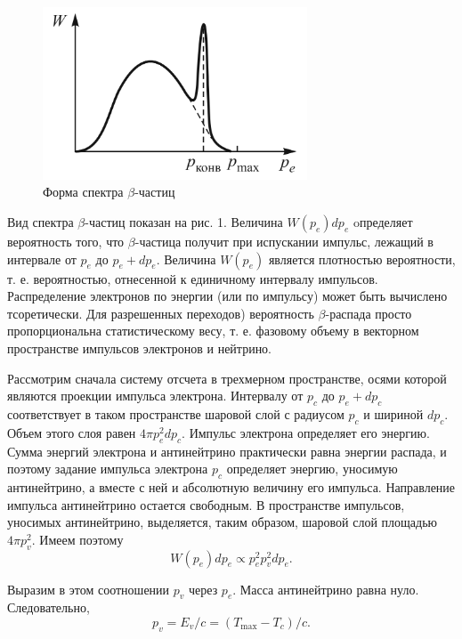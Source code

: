 \documentclass[a4paper, 12pt]{article}
\begin{document}
\begin{figure}[H]
    \centering
    \includegraphics[width=0.7\textwidth]{graph1.png}
    \caption{Форма спектра $\beta$-частиц}
    \label{fig:plot1}
\end{figure}

Вид спектра $\beta$-частиц показан на рис. 1. Величина $W\left(p_e\right) d p_e$ oпределяет вероятность того, что $\beta$-частица получит при испускании импульс, лежащий в интервале от $p_e$ до $p_e+d p_e$. Величина $W\left(p_e\right)$ является плотностью вероятности, т. е. вероятностью, отнесенной к единичному интервалу импульсов. Распределение электронов по энергии (или по импульсу) может быть вычислено тсоретически. Для разрешенных переходов) вероятность $\beta$-распада просто пропорциональна статистическому весу, т. е. фазовому объему в векторном пространстве импульсов электронов и нейтрино.

Рассмотрим сначала систему отсчета в трехмерном пространстве, осями которой являются проекции импульса электрона. Интервалу от $p_c$ до $p_e+d p_c$ соответствует в таком пространстве шаровой слой с радиусом $p_c$ и шириной $d p_c$. Объем этого слоя равен $4 \pi p_e^2 d p_c$. Импульс электрона определяет его энергию. Сумма энергий электрона и антинейтрино практически равна энергии распада, и поэтому задание импульса электрона $p_c$ определяет энергию, уносимую антинейтрино, а вместе с ней и абсолютную величину его импульса. Направление импульса антинейтрино остается свободным. В пространстве импульсов, уносимых антинейтрино, выделяется, таким образом, шаровой слой площадью $4 \pi p_v^2$. Имеем поэтому
\begin{equation}
W\left(p_e\right) d p_e \propto p_e^2 p_v^2 d p_e .
\end{equation}

Выразим в этом соотношении $p_v$ через $p_e$. Масса антинейтрино равна нуло. Следовательно,
\begin{equation}
p_v=E_v / c=\left(T_{\max }-T_c\right) / c .
\end{equation}
\end{document}
